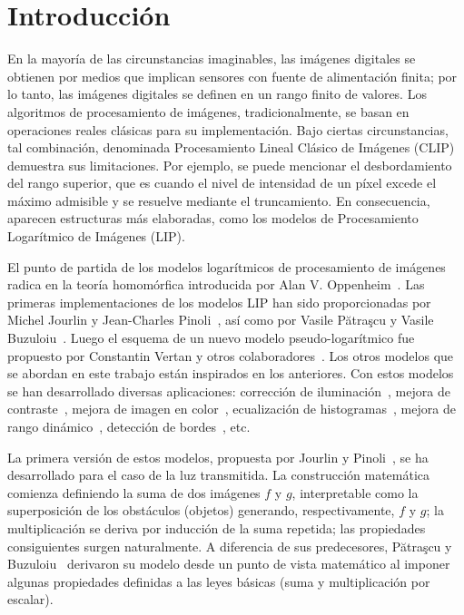 \chapter*{Introducción}\label{chapter:introduction}

En la mayoría de las circunstancias imaginables, las imágenes digitales se obtienen por medios que implican sensores con fuente de alimentación finita; por lo tanto, las imágenes digitales se definen en un rango finito de valores. Los algoritmos de procesamiento de imágenes, tradicionalmente, se basan en operaciones reales clásicas para su implementación. Bajo ciertas circunstancias, tal combinación, denominada Procesamiento Lineal Clásico de Imágenes (CLIP) demuestra sus limitaciones. Por ejemplo, se puede mencionar el desbordamiento del rango superior, que es cuando el nivel de intensidad de un p\'ixel excede el m\'aximo admisible y se resuelve mediante el truncamiento. En consecuencia, aparecen estructuras más elaboradas, como los modelos de Procesamiento Logarítmico de Imágenes (LIP).

El punto de partida de los modelos logarítmicos de procesamiento de imágenes radica en la teoría homomórfica introducida por Alan V. Oppenheim~\cite{oppenheim1965superposition}. Las primeras implementaciones de los modelos LIP han sido proporcionadas por Michel Jourlin y Jean-Charles Pinoli~\cite{jourlin1988model}, as\'i como por Vasile Pătraşcu y Vasile Buzuloiu~\cite{patrascu2014mathematical}. Luego el esquema de un nuevo modelo pseudo-logarítmico fue propuesto por Constantin Vertan y otros colaboradores~\cite{vertan2008pseudo}. Los otros modelos que se abordan en este trabajo est\'an inspirados en los anteriores. Con estos modelos se han desarrollado diversas aplicaciones: corrección de iluminación~\cite{patrascu2001modele}, mejora de contraste~\cite{deng1995study}, mejora de imagen en color~\cite{patrascu2001modele}, ecualización de histogramas~\cite{puatracscu2003fuzzy}, mejora de rango dinámico~\cite{florea2008use}, detección de bordes~\cite{vertan2008pseudo}, etc.

La primera versi\'on de estos modelos, propuesta por Jourlin y Pinoli~\cite{jourlin1988model}, se ha desarrollado para el caso de la luz transmitida. La construcción matemática comienza definiendo la suma de dos imágenes $f$ y $g$, interpretable como la superposición de los obstáculos (objetos) generando, respectivamente, $f$ y $g$; la multiplicación se deriva por inducción de la suma repetida; las propiedades consiguientes surgen naturalmente. A diferencia de sus predecesores, Pătraşcu y Buzuloiu~\cite{patrascu2014mathematical} derivaron su modelo desde un punto de vista matemático al imponer algunas propiedades definidas a las leyes básicas (suma y multiplicación por escalar).

